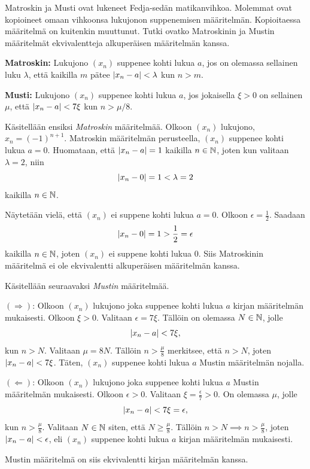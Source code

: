 \documentclass[12pt,a4paper]{article}
\begin{document}
\begin{exercise}
Matroskin ja Musti ovat lukeneet Fedja-sedän matikanvihkoa. Molemmat ovat
kopioineet omaan vihkoonsa lukujonon suppenemisen määritelmän. Kopioitaessa
määritelmä on kuitenkin muuttunut. Tutki ovatko Matroskinin ja Mustin
määritelmät ekvivalentteja alkuperäisen määritelmän kanssa.

\textbf{Matroskin:} Lukujono $(x_n)$ suppenee kohti lukua $a$, jos on
olemassa sellainen luku $\lambda$, että kaikilla $m$ pätee
$\lvert x_n-a\rvert<\lambda$ kun $n>m$.

\textbf{Musti:} Lukujono $(x_n)$ suppenee kohti lukua $a$, jos jokaisella
$\xi>0$ on sellainen $\mu$, että $\lvert x_n-a\rvert<7\xi$ kun $n>\mu/8$.
\end{exercise}

\begin{solution}
Käsitellään ensiksi \emph{Matroskin} määritelmää. Olkoon \((x_n)\) lukujono,
\(x_n = (-1)^{n + 1}\). Matroskin määritelmän perusteella, \((x_n)\) suppenee
kohti lukua \(a = 0\). Huomataan, että \(\lvert x_n - a\rvert = 1\) kaikilla
\(n \in \mathbb{N}\), joten kun valitaan \(\lambda = 2\), niin
\[
\lvert x_n - 0\rvert = 1 < \lambda = 2
\]
kaikilla \(n \in \mathbb{N}\).

Näytetään vielä, että \((x_n)\) ei suppene kohti lukua \(a = 0\). Olkoon
\(\epsilon = \frac{1}{2}\). Saadaan
\[
\lvert x_n - 0\rvert = 1 > \frac{1}{2} = \epsilon
\]
kaikilla \(n \in \mathbb{N}\), joten \((x_n)\) ei suppene kohti lukua \(0\).
Siis Matroskinin määritelmä ei ole ekvivalentti alkuperäisen määritelmän kanssa.

Käsitellään seuraavaksi \emph{Mustin} määritelmää.

\((\Rightarrow)\): Olkoon \((x_n)\) lukujono joka suppenee kohti lukua \(a\)
kirjan määritelmän mukaisesti. Olkoon \(\xi > 0\). Valitaan \(\epsilon = 7\xi\).
Tällöin on olemassa \(N \in \mathbb{N}\), jolle
\[
\lvert x_n - a\rvert < 7\xi,
\]
kun \(n > N\). Valitaan \(\mu = 8N\). Tällöin \(n > \frac{\mu}{8}\) merkitsee,
että \(n > N\), joten \(\lvert x_n - a\rvert < 7\xi\). Täten, \((x_n)\) suppenee
kohti lukua \(a\) Mustin määritelmän nojalla.

\((\Leftarrow)\): Olkoon \((x_n)\) lukujono joka suppenee kohti lukua \(a\)
Mustin määritelmän mukaisesti. Olkoon \(\epsilon > 0\). Valitaan
\(\xi = \frac{\epsilon}{7} > 0\). On olemassa \(\mu\), jolle
\[
\lvert x_n - a\rvert < 7\xi = \epsilon,
\]
kun \(n > \frac{\mu}{8}\). Valitaan \(N \in \mathbb{N}\) siten, että
\(N \geq \frac{\mu}{8}\). Tällöin \(n > N \implies n > \frac{\mu}{8}\), joten
\(\lvert x_n - a\rvert < \epsilon\), eli \((x_n)\) suppenee kohti lukua \(a\) kirjan
määritelmän mukaisesti.

Mustin määritelmä on siis ekvivalentti kirjan määritelmän kanssa.
\end{solution}
\end{document}
